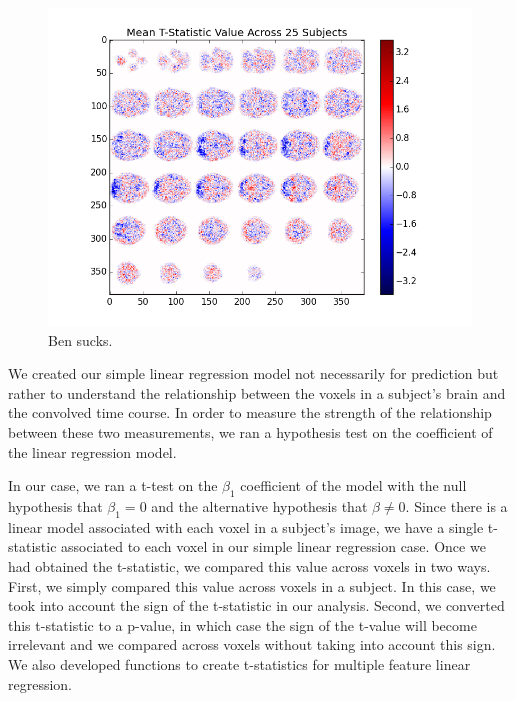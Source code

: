 
\begin{figure}[ht]

\centering

\includegraphics[scale=0.5]{images/hypothesis_testing}  

\caption{Ben sucks.}

\label{fig:mask}

\end{figure}


\par \indent We created our simple linear regression model not necessarily for prediction but rather to understand the relationship between the voxels in a subject's brain and the convolved time course. In order to measure the strength of the relationship between these two measurements, we ran a hypothesis test on the coefficient of the linear regression model.
	\par In our case, we ran a t-test on the $\beta_1$ coefficient of the model with the null hypothesis that $\beta_1=0$ and the alternative hypothesis that $\beta \neq 0$. Since there is a linear model associated with each voxel in a subject’s image, we have a single t-statistic associated to each voxel in our simple linear regression case. Once we had obtained the t-statistic, we compared this value across voxels in two ways. First, we simply compared this value across voxels in a subject. In this case, we took into account the sign of the t-statistic in our analysis. Second, we converted this t-statistic to a p-value, in which case the sign of the t-value will become irrelevant and we compared across voxels without taking into account this sign.  We also developed functions to create t-statistics for multiple feature linear regression. 
	
